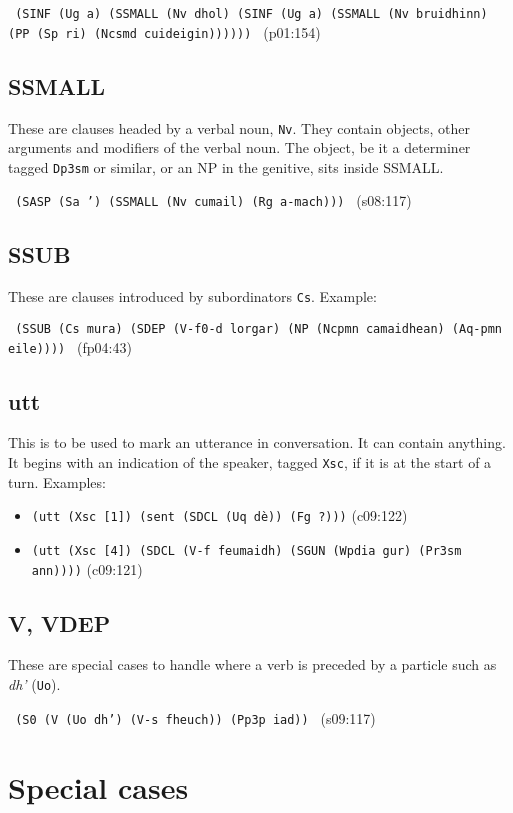 \documentclass[a4paper]{article}
\begin{document}
\texttt{
(SINF (Ug a) (SSMALL (Nv dhol) (SINF (Ug a) (SSMALL (Nv bruidhinn) (PP (Sp ri) (Ncsmd cuideigin))))))
} (p01:154)

\subsection{SSMALL}

These are clauses headed by a verbal noun, \texttt{Nv}.
They contain objects, other arguments and modifiers of the verbal noun.
The object, be it a determiner tagged \texttt{Dp3sm} or similar, or an NP in the genitive, sits inside SSMALL.

\texttt{
(SASP (Sa ') (SSMALL (Nv cumail) (Rg a-mach)))
} (s08:117)

\subsection{SSUB}

These are clauses introduced by subordinators \texttt{Cs}.
Example:

\texttt{
(SSUB (Cs mura) (SDEP (V-f0-d lorgar) (NP (Ncpmn camaidhean) (Aq-pmn eile))))
} (fp04:43)

\subsection{utt}

This is to be used to mark an utterance in conversation.
It can contain anything.
It begins with an indication of the speaker, tagged \texttt{Xsc}, if it is at the start of a turn.
Examples:
\begin{itemize}
\item \texttt{(utt (Xsc [1]) (sent (SDCL (Uq d\`e)) (Fg ?)))} (c09:122)
\item \texttt{(utt (Xsc [4]) (SDCL (V-f feumaidh) (SGUN (Wpdia gur) (Pr3sm ann))))} (c09:121)
\end{itemize}

\subsection{V, VDEP}

These are special cases to handle where a verb is preceded by a particle such as \textit{dh'} (\texttt{Uo}).

\texttt{
(S0 (V (Uo dh') (V-s fheuch)) (Pp3p iad))
} (s09:117)

\section{Special cases}
\end{document}
